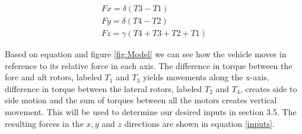 \documentclass[12pt]{extarticle}
\begin{document}
{%



\begin{equation}
\begin{split}
Fx= \delta(T3-T1)
\\
Fy= \delta(T4-T2)
\\
Fz= \gamma(T4+T3+T2+T1)
\end{split}
\label{inputs}
\end{equation}

Based on equation and figure \ref{fig:Model} we can see how the vehicle moves in reference to its relative force in each axis. The difference in torque between the fore and aft rotors, labeled $T_1$ and $T_3$ yields movements along the x-axis, difference in torque between the lateral rotors, labeled $T_2$ and $T_4$, creates side to side motion and the sum of torques between all the motors creates vertical movement. This will be used to determine our desired inputs in section 3.5. The resulting forces in the $x,y$ and $z$ directions are shown in equation \ref{inputs}.

}
\end{document}
